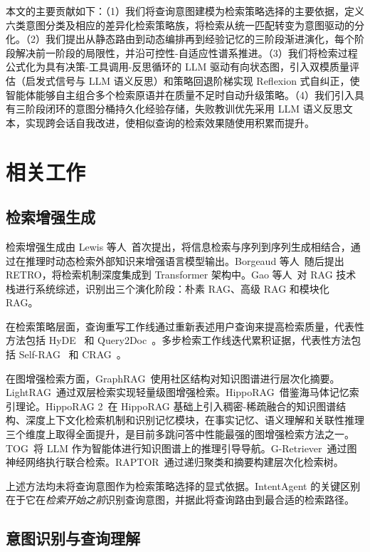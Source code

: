\documentclass[runningheads]{llncs}
\begin{document}
本文的主要贡献如下：（1）我们将查询意图建模为检索策略选择的主要依据，定义六类意图分类及相应的差异化检索策略族，将检索从统一匹配转变为意图驱动的分化。（2）我们提出从静态路由到动态编排再到经验记忆的三阶段渐进演化，每个阶段解决前一阶段的局限性，并沿可控性-自适应性谱系推进。（3）我们将检索过程公式化为具有决策-工具调用-反思循环的 LLM 驱动有向状态图，引入双模质量评估（启发式信号与 LLM 语义反思）和策略回退阶梯实现 Reflexion 式自纠正，使智能体能够自主组合多个检索原语并在质量不足时自动升级策略。（4）我们引入具有三阶段闭环的意图分桶持久化经验存储，失败教训优先采用 LLM 语义反思文本，实现跨会话自我改进，使相似查询的检索效果随使用积累而提升。

\section{相关工作}

\subsection{检索增强生成}

检索增强生成由 Lewis 等人~\cite{ref1}首次提出，将信息检索与序列到序列生成相结合，通过在推理时动态检索外部知识来增强语言模型输出。Borgeaud 等人~\cite{ref3}随后提出 RETRO，将检索机制深度集成到 Transformer 架构中。Gao 等人~\cite{ref2}对 RAG 技术栈进行系统综述，识别出三个演化阶段：朴素 RAG、高级 RAG 和模块化 RAG。

在检索策略层面，查询重写工作线通过重新表述用户查询来提高检索质量，代表性方法包括 HyDE~\cite{ref4} 和 Query2Doc~\cite{ref5}。多步检索工作线迭代累积证据，代表性方法包括 Self-RAG~\cite{ref6} 和 CRAG~\cite{ref7}。

在图增强检索方面，GraphRAG~\cite{ref27}使用社区结构对知识图谱进行层次化摘要。LightRAG~\cite{ref26}通过双层检索实现轻量级图增强检索。HippoRAG~\cite{ref28}借鉴海马体记忆索引理论。HippoRAG 2~\cite{ref30}在 HippoRAG 基础上引入稠密-稀疏融合的知识图谱结构、深度上下文化检索机制和识别记忆模块，在事实记忆、语义理解和关联性推理三个维度上取得全面提升，是目前多跳问答中性能最强的图增强检索方法之一。TOG~\cite{ref24}将 LLM 作为智能体进行知识图谱上的推理引导导航。G-Retriever~\cite{ref25}通过图神经网络执行联合检索。RAPTOR~\cite{ref23}通过递归聚类和摘要构建层次化检索树。

上述方法均未将查询意图作为检索策略选择的显式依据。IntentAgent 的关键区别在于它在\emph{检索开始之前}识别查询意图，并据此将查询路由到最合适的检索路径。

\subsection{意图识别与查询理解}
\end{document}
